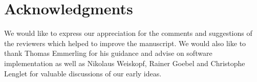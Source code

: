 \clearpage
\section{Acknowledgments}
We would like to express our appreciation for the comments and suggestions of the reviewers which helped to improve the manuscript. We would also like to thank Thomas Emmerling for his guidance and advise on software implementation as well as Nikolaus Weiskopf, Rainer Goebel and Christophe Lenglet for valuable discussions of our early ideas.

\stopsupplement
\clearpage
\printbibliography[heading=subbibnumbered, title={References}]